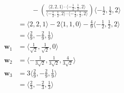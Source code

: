 \documentclass{article}
\begin{document}
\begin{align*}
               & \qquad - \left( \frac{\langle 2, 2, 1 \rangle \cdot \langle -\frac{1}{2}, \frac{1}{2}, 2 \rangle}{\langle -\frac{1}{2}, \frac{1}{2}, 2 \rangle \cdot \langle -\frac{1}{2}, \frac{1}{2}, 2 \rangle} \right) \langle -\frac{1}{2}, \frac{1}{2}, 2 \rangle \\
               & = \langle 2, 2, 1 \rangle - 2 \langle 1, 1, 0 \rangle - \frac{4}{9} \langle -\frac{1}{2}, \frac{1}{2}, 2 \rangle                                                                                                                                        \\
               & = \langle \frac{2}{9}, -\frac{2}{9}, \frac{1}{9} \rangle                                                                                                                                                                                                \\
  \mathbf{w}_1 & = \langle \frac{1}{\sqrt{2}}, \frac{1}{\sqrt{2}}, 0 \rangle                                                                                                                                                                                             \\
  \mathbf{w}_2 & = \langle -\frac{1}{3 \sqrt{2}}, \frac{1}{3 \sqrt{2}}, \frac{4}{3 \sqrt{2}} \rangle                                                                                                                                                                     \\
  \mathbf{w}_3 & = 3 \langle \frac{2}{9}, -\frac{2}{9}, \frac{1}{9} \rangle                                                                                                                                                                                              \\
               & = \langle \frac{2}{3}, -\frac{2}{3}, \frac{1}{3} \rangle
\end{align*}

\setcounter{subsubsection}{16}
\subsubsection{}
\end{document}
